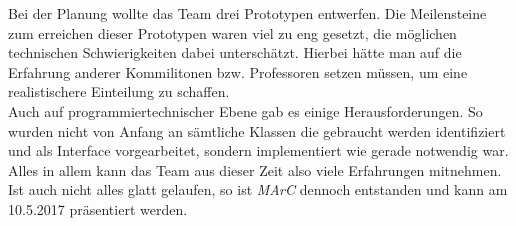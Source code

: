 Bei der Planung wollte das Team drei Prototypen entwerfen. Die Meilensteine zum erreichen dieser Prototypen waren viel zu eng gesetzt, die möglichen technischen Schwierigkeiten dabei unterschätzt. Hierbei hätte man auf die Erfahrung anderer Kommilitonen bzw. Professoren setzen müssen, um eine realistischere Einteilung zu schaffen.\\
Auch auf programmiertechnischer Ebene gab es einige Herausforderungen. So wurden nicht von Anfang an sämtliche Klassen die gebraucht werden identifiziert und als Interface vorgearbeitet, sondern implementiert wie gerade notwendig war. \\
Alles in allem kann das Team aus dieser Zeit also viele Erfahrungen mitnehmen. Ist auch nicht alles glatt gelaufen, so ist \textit{MArC} dennoch entstanden und kann am 10.5.2017 präsentiert werden.


























